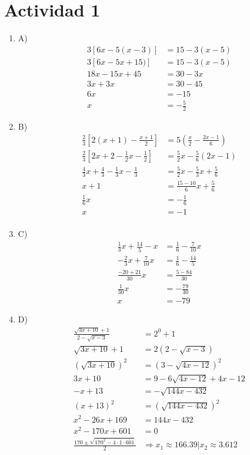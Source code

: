 \section*{Actividad 1}
\begin{enumerate}
	\item[] A) 
	\begin{align*}
		3[ 6x - 5(x-3)] &= 15 - 3(x-5)\\
		3[6x-5x+15)]&=15-3(x-5)\\
		18x-15x+45 &= 30 - 3x\\
		3x + 3x &= 30 - 45\\
		6x &= -15\\
		x &= -\frac{5}{2}
	\end{align*}

	\item[] B)
	\begin{align*}
		\frac{2}{3} \left[ 2(x+1) - \frac{x+1}{2} \right] &= 5 \left( \frac{x}{2} - \frac{2x - 1}{6}\right) \\
		\frac{2}{3} \left[ 2x+2 - \frac{1}{2}x - \frac{1}{2} \right] &= \frac{5}{2}x - \frac{5}{6}(2x-1)  \\
		\frac{4}{3}x + \frac{4}{3} - \frac{1}{3}x - \frac{1}{3} &= \frac{5}{2}x - \frac{5}{3}x + \frac{5}{6}\\
		x+1 &= \frac{15-10}{6}x + \frac{5}{6}\\
		\frac{1}{6}x &= - \frac{1}{6}\\
		x&=-1\\
	\end{align*}

	\item[] C)
	\begin{align*}
		\frac{1}{3}x + \frac{14}{5} - x &= \frac{1}{6} - \frac{7}{10}x \\
		- \frac{2}{3}x + \frac{7}{10}x &= \frac{1}{6} - \frac{14}{5}\\
		\frac{-20+21}{30}x &= \frac{5-84}{30}\\
		\frac{1}{30}x &= - \frac{79}{30}\\
		x &= -79
	\end{align*}

	\item[] D)
	\begin{align*}
		\frac{\sqrt{3x+10}+1}{2-\sqrt{x-3}} &= 2^{0} + 1\\
		\sqrt{3x+10}+1 &= 2 \left( 2-\sqrt{x-3} \right)\\
		\left( \sqrt{3x+10} \right)^{2} &= \left( 3-\sqrt{4x-12} \right)^{2}\\
		3x+10 &= 9 - 6\sqrt{4x-12} + 4x - 12\\
		-x + 13 &= - \sqrt{144x - 432}\\
		(x + 13)^{2} &= (\sqrt{144x - 432})^{2}\\
		x^2 - 26x + 169 &= 144x - 432\\
		x^2 - 170x + 601 &= 0\\
		\frac{170 \pm \sqrt{170^2 - 4 \cdot 1 \cdot 601}}{2} &\Rightarrow x_{1}\approx 166.39 | x_{2} \approx 3.612\\
	\end{align*}


\end{enumerate}
